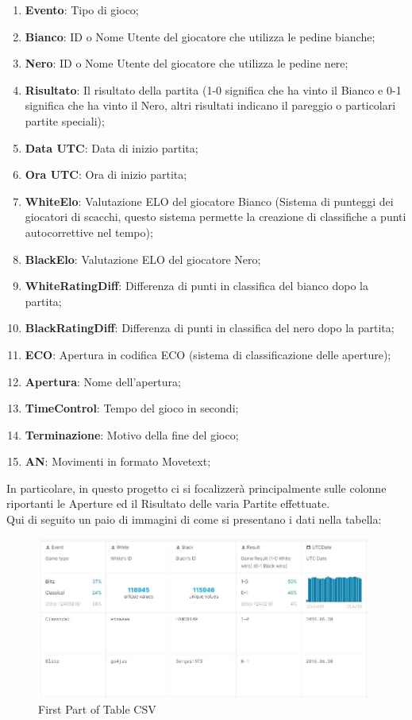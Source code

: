 \documentclass[10pt]{article}
\begin{document}
\begin{enumerate}
    \item \textbf{Evento}: Tipo di gioco; 
    \item \textbf{Bianco}: ID o Nome Utente del giocatore che utilizza le pedine bianche;
    \item \textbf{Nero}: ID o Nome Utente del giocatore che utilizza le pedine nere;
    \item \textbf{Risultato}: Il risultato della partita (1-0 significa che ha vinto il Bianco e 0-1 significa che ha vinto il Nero, altri risultati indicano il pareggio o particolari partite speciali);
    \item \textbf{Data UTC}: Data di inizio partita;
    \item \textbf{Ora UTC}: Ora di inizio partita;
    \item \textbf{WhiteElo}: Valutazione ELO del giocatore Bianco (Sistema di punteggi dei giocatori di scacchi, questo sistema permette la creazione di classifiche a punti autocorrettive nel tempo);
    \item \textbf{BlackElo}: Valutazione ELO del giocatore Nero;
    \item \textbf{WhiteRatingDiff}: Differenza di punti in classifica del bianco dopo la partita;
    \item \textbf{BlackRatingDiff}: Differenza di punti in classifica del nero dopo la partita;
    \item \textbf{ECO}: Apertura in codifica ECO (sistema di classificazione delle aperture);
    \item \textbf{Apertura}: Nome dell'apertura;
    \item \textbf{TimeControl}: Tempo del gioco in secondi;
    \item \textbf{Terminazione}: Motivo della fine del gioco;
    \item \textbf{AN}: Movimenti in formato Movetext;
\end{enumerate}
In particolare, in questo progetto ci si focalizzer\`a principalmente sulle colonne riportanti le Aperture ed il Risultato delle varia Partite effettuate.\\
Qui di seguito un paio di immagini di come si presentano i dati nella tabella:
\begin{figure}[htp]
    \centering
    \includegraphics[width=11cm]{images/z1.JPG}
    \caption{First Part of Table CSV}
\end{figure}
\end{document}

